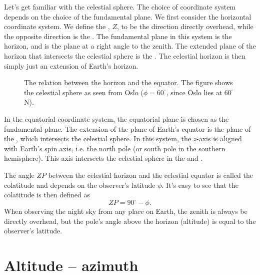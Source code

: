 Let's get familiar with the celestial sphere. The choice of coordinate system depends on
the choice of the fundamental plane. We first consider the horizontal coordinate system.
We define the , $Z$, to be the direction
directly overhead, while the opposite direction is the . The fundamental plane
in this system is the horizon, and is the plane at a right angle to the zenith.
The extended plane of the horizon that intersects the celestial sphere is the
.
The celestial horizon is then simply just an extension of
Earth's horizon.

%
\begin{figure}[htpb]
	\centering
	
	\caption{The relation between the horizon and the equator. The figure shows the
		celestial sphere as seen from Oslo ($\phi = 60^{\circ}$, since Oslo lies at 
		$60^{\circ}$ N).}
	\label{fig:cel-sph-test}
\end{figure}
%
In the equatorial coordinate system, the equatorial plane is chosen as the fundamental
plane. The extension of the plane of Earth's equator is the plane of the
,
which intersects the celestial sphere.
In this system, the $z$-axis is aligned with Earth's spin
axis, i.e. the north pole (or south pole in the southern hemisphere). This axis intersects
the celestial sphere in the  and .

The angle $ZP$ between the celestial horizon and the celestial equator is called the
colatitude and depends on the
observer's latitude $\phi$. It's easy to see that the colatitude is then defined as
\[ ZP = 90^{\circ} - \phi. \]
When observing the night sky from any place on Earth, the
zenith is always be directly overhead, but the pole's angle above the horizon (altitude)
is equal to the observer's latitude.

\section{Altitude -- azimuth}

